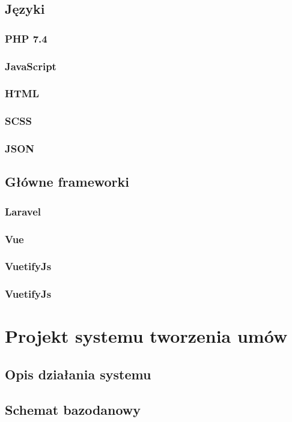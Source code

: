 \documentclass[12pt]{article}
\begin{document}
        \subsection{Języki}
            \subsubsection{PHP 7.4}
            \subsubsection{JavaScript}
            \subsubsection{HTML}
            \subsubsection{SCSS}
            \subsubsection{JSON}
        \subsection{Główne frameworki}
            \subsubsection{Laravel}
            \subsubsection{Vue}
            \subsubsection{VuetifyJs}
            \subsubsection{VuetifyJs}
    \section{Projekt systemu tworzenia umów}
         \subsection{Opis działania systemu}
         \subsection{Schemat bazodanowy}
\end{document}
